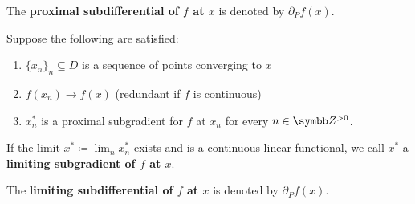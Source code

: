 \begin{definition}
\begin{defenum}
    The \textbf{proximal subdifferential of \( f \) at \( x \)} is denoted by \( \partial_P f(x) \).

    \cite[definition 11.10]{Clarke2013} Suppose the following are satisfied:
    \begin{enumerate}
      \item \( \{ x_n \}_n \subseteq D \) is a sequence of points converging to \( x \)
      \item \( f(x_n) \to f(x) \) (redundant if \( f \) is continuous)
      \item \( x_n^* \) is a proximal subgradient for \( f \) at \( x_n \) for every \( n \in \BB{Z}^{>0} \).
    \end{enumerate}

    If the limit \( x^* \coloneqq \lim_n x_n^* \) exists and is a continuous linear functional, we call \( x^* \) a \textbf{limiting subgradient of \( f \) at \( x \)}.

    The \textbf{limiting subdifferential of \( f \) at \( x \)} is denoted by \( \partial_P f(x) \).
  \end{defenum}
\end{definition}
